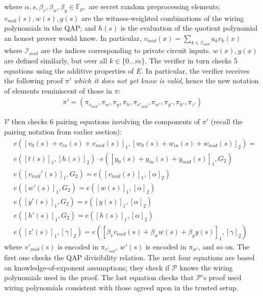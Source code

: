 where $\alpha, s, \beta_v, \beta_w, \beta_y \in \mathbb{F}_p, $ are secret random preprocessing elements; $v_{mid}(s), w(s), y(s)$ are the witness-weighted combinations of the wiring polynomials in the QAP; and $h(s)$ is the evaluation of the quotient polynomial an honest prover would know. In particular, $v_{mid}(x) = \sum_{k \in \mathcal{I}_{mid}} a_k v_k(x)$ where $\mathcal{I}_{mid}$ are the indices corresponding to private circuit inputs. $w(x), y(x)$ are defined similarly, but over all $k \in \{0 \dots m\}$. The verifier in turn checks 5 equations using the additive properties of $E$. In particular, the verifier receives the following proof $\pi'$ \textit{which it does not yet know is valid}, hence the new notation of elements reminiscent of those in $\pi$:
\begin{align*}
\pi' = (\pi_{v_{mid}}, \pi_{w}, \pi_{y}, \pi_{h}, \pi_{v'_{mid}}, \pi_{w'}, \pi_{y'}, \pi_{h'}, \pi_{z'})
\end{align*}

\noindent $\mathcal{V}$ then checks 6 pairing equations involving the components of $\pi'$ (recall the pairing notation from earlier section):  
\begin{align}
&e([v_0(s) + v_{in}(s) + v_{mid}(s)]_1, [w_0(s) + w_{in}(s) + w_{mid}(s)]_2) = \\ 
&e([t(s)]_1, [h(s)]_2) \cdot e([y_0(s) + y_{in}(s) + y_{mid}(s)]_1, G_2) \\
&e([v_{mid}'(s)]_1, G_2) = e([v_{mid}(s)]_1, [\alpha]_2) \\
&e([w'(s)]_1, G_2) = e([w(s)]_1, [\alpha]_2) \\
&e([y'(s)]_1, G_2) = e([y(s)]_1, [\alpha]_2) \\
&e([h'(s)]_1, G_2) = e([h(s)]_1, [\alpha]_2) \\
&e([z'(s)]_1, [\gamma]_2) = e([\beta_v v_{mid}(s) + \beta_w w(s) + \beta_y y(s)]_1, [\gamma]_2)
\end{align}
\noindent where $v'_{mid}(s)$ is encoded in $\pi_{v'_{mid}}$, $w'(s)$ is encoded in $\pi_{w'}$, and so on. The first one checks the QAP divisibility relation. The next four equations are based on knowledge-of-exponent assumptions; they check if $\mathcal{P}$ knows the wiring polynomials used in the proof. The last equation checks that $\mathcal{P}$'s proof used wiring polynomials consistent with those agreed upon in the trusted setup. \\


